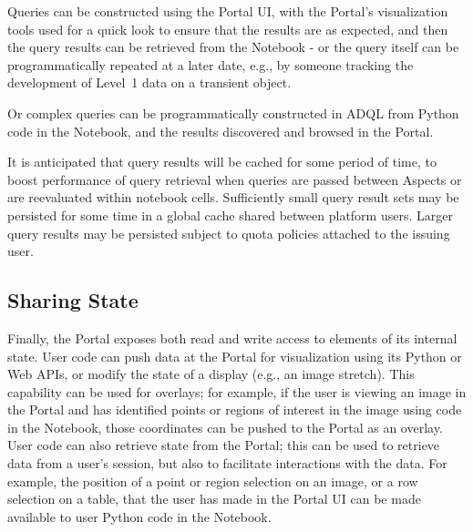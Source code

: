 Queries can be constructed using the Portal UI, with the Portal's visualization tools used for a quick look to ensure that the results are as expected, and then the query results can be retrieved from the Notebook - or the query itself can be programmatically repeated at a later date, e.g., by someone tracking the development of Level~1 data on a transient object.

Or complex queries can be programmatically constructed in ADQL from Python code in the Notebook, and the results discovered and browsed in the Portal.

It is anticipated that query results will be cached for some period of time, to boost performance of query retrieval when queries are passed between Aspects or are reevaluated within notebook cells.
Sufficiently small query result sets may be persisted for some time in a global cache shared between platform users.
Larger query results may be persisted subject to quota policies attached to the issuing user.

\subsection{Sharing State}\label{sharing-state}

Finally, the Portal exposes both read and write access to elements of its internal state.
User code can push data at the Portal for visualization using its Python or Web APIs, or modify the state of a display (e.g., an image stretch).
This capability can be used for overlays; for example, if the user is viewing an image in the Portal and has identified points or regions of interest in the image using code in the Notebook, those coordinates can be pushed to the Portal as an overlay.
User code can also retrieve state from the Portal; this can be used to retrieve data from a user's session, but also to facilitate interactions with the data.
For example, the position of a point or region selection on an image, or a row selection on a table, that the user has made in the Portal UI can be made available to user Python code in the Notebook.

